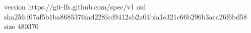 version https://git-lfs.github.com/spec/v1
oid sha256:f07af5b1ba8685376fad228fcd9412ab2a04bfa1c321c66b296b3aca26f6bd58
size 480370
